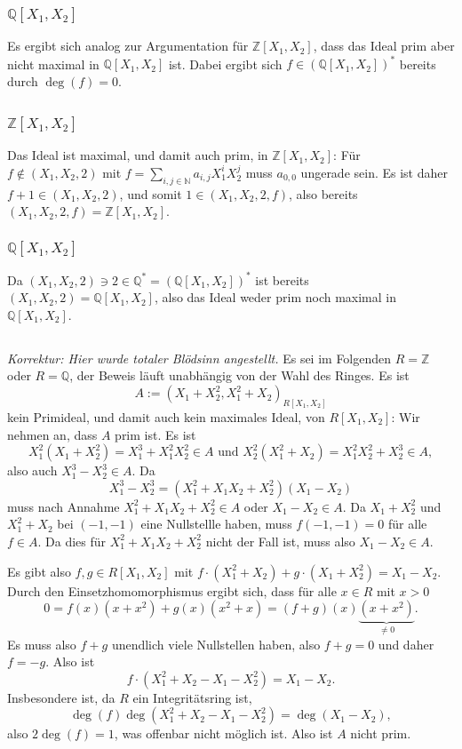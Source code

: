 \documentclass[a4paper,10pt]{article}
\theoremstyle{definition}
\newcommand{\N}{\mathbb{N}}
\newcommand{\Z}{\mathbb{Z}}
\newcommand{\Q}{\mathbb{Q}}
\begin{document}
\subsubsection{$\Q[X_1, X_2]$}
Es ergibt sich analog zur Argumentation für $\Z[X_1, X_2]$, dass das Ideal prim aber nicht maximal in $\Q[X_1, X_2]$ ist. Dabei ergibt sich $f \in (\Q[X_1, X_2])^*$ bereits durch $\deg(f) = 0$.


\subsection{}

\subsubsection{$\Z[X_1, X_2]$}
Das Ideal ist maximal, und damit auch prim, in $\Z[X_1, X_2]$: Für $f \not\in (X_1, X_2, 2)$ mit $f = \sum_{i,j \in \N} a_{i,j} X^i_1 X^j_2$ muss $a_{0,0}$ ungerade sein. Es ist daher $f+1 \in (X_1, X_2, 2)$, und somit $1 \in (X_1, X_2, 2, f)$, also bereits $(X_1, X_2, 2, f) = \Z[X_1, X_2]$.

\subsubsection{$\Q[X_1, X_2]$}
Da $(X_1, X_2, 2) \ni 2 \in \Q^* = (\Q[X_1, X_2])^*$ ist bereits $(X_1, X_2, 2) = \Q[X_1, X_2]$, also das Ideal weder prim noch maximal in $\Q[X_1, X_2]$.


\subsection{}
\emph{Korrektur: Hier wurde totaler Blödsinn angestellt.}
Es sei im Folgenden $R = \Z$ oder $R = \Q$, der Beweis läuft unabhängig von der Wahl des Ringes. Es ist
\[
 A := (X_1 + X_2^2, X_1^2 + X_2)_{R[X_1, X_2]}
\]
kein Primideal, und damit auch kein maximales Ideal, von $R[X_1, X_2]$: Wir nehmen an, dass $A$ prim ist. Es ist
\[
 X_1^2 (X_1 + X_2^2) = X_1^3 + X_1^2 X_2^2 \in A \text{ und }
 X_2^2 (X_1^2 + X_2) = X_1^2 X_2^2 + X_2^3 \in A,
\]
also auch $X_1^3 - X_2^3 \in A$. Da
\[
 X_1^3 - X_2^3 = (X_1^2 + X_1 X_2 + X_2^2)(X_1 - X_2)
\]
muss nach Annahme $X_1^2 + X_1 X_2 + X_2^2 \in A$ oder $X_1 - X_2 \in A$. Da $X_1+X_2^2$ und $X_1^2+X_2$ bei $(-1,-1)$ eine Nullstellle haben, muss $f(-1,-1) = 0$ für alle $f \in A$. Da dies für $X_1^2 + X_1 X_2 + X_2^2$ nicht der Fall ist, muss also $X_1 - X_2 \in A$.

Es gibt also $f,g \in R[X_1, X_2]$ mit $f \cdot (X_1^2+X_2) + g \cdot (X_1+X_2^2) = X_1 - X_2$. Durch den Einsetzhomomorphismus ergibt sich, dass für alle $x \in R$ mit $x > 0$
\[
 0 = f(x)(x+x^2)+g(x)(x^2+x) = (f+g)(x)\underbrace{(x+x^2)}_{\neq 0}.
\]
Es muss also $f+g$ unendlich viele Nullstellen haben, also $f+g=0$ und daher $f=-g$. Also ist
\[
 f\cdot (X_1^2 +X_2 -X_1- X_2^2) = X_1 - X_2.
\]
Insbesondere ist, da $R$ ein Integritätsring ist,
\[
 \deg(f) \deg(X_1^2 +X_2 -X_1- X_2^2) = \deg(X_1 - X_2),
\]
also $2 \deg(f) = 1$, was offenbar nicht möglich ist. Also ist $A$ nicht prim.
\end{document}
